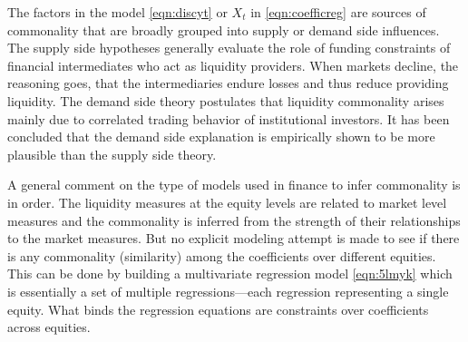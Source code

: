 The factors in the model \eqref{eqn:discyt} or $X_t$ in \eqref{eqn:coefficreg} are sources of commonality that are broadly grouped into supply or demand side influences. The supply side hypotheses generally evaluate the role of funding constraints of financial intermediates who act as liquidity providers. When markets decline, the reasoning goes, that the intermediaries endure losses and thus reduce providing liquidity. The demand side theory postulates that liquidity commonality arises mainly due to correlated trading behavior of institutional investors. It has been concluded that the demand side explanation is empirically shown to be more plausible than the supply side theory. \twomedskip


A general comment on the type of models used in finance to infer commonality is in order. The liquidity measures at the equity levels are related to market level measures and the commonality is inferred from the strength of their relationships to the market measures. But no explicit modeling attempt is made to see if there is any commonality (similarity) among the coefficients over different equities. This can be done by building a multivariate regression model \eqref{eqn:5lmyk} which is essentially a set of multiple regressions---each regression representing a single equity. What binds the regression equations are constraints over coefficients across equities. 



